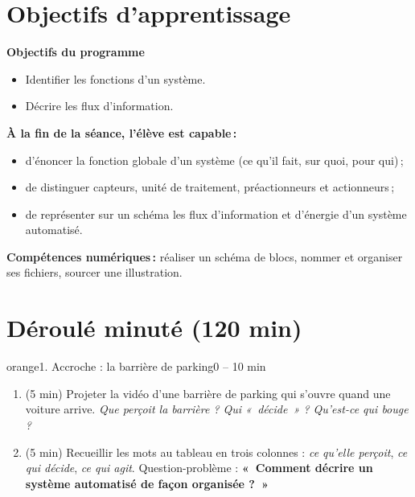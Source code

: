 \documentclass[11pt,a4paper]{article}
\begin{document}
\section{Objectifs d'apprentissage}
\begin{tcolorbox}[colback=gray!8,colframe=gray!60!black,arc=1mm,boxrule=0.5pt]
\textbf{Objectifs du programme}
\begin{itemize}
 \item Identifier les fonctions d'un système.
 \item Décrire les flux d'information.
\end{itemize}
\textbf{À la fin de la séance, l'élève est capable\,:}
\begin{itemize}
 \item d'énoncer la fonction globale d'un système (ce qu'il fait, sur quoi, pour qui)\,;
 \item de distinguer capteurs, unité de traitement, préactionneurs et actionneurs\,;
 \item de représenter sur un schéma les flux d'information et d'énergie d'un système automatisé.
\end{itemize}
\textbf{Compétences numériques\,:} réaliser un schéma de blocs, nommer et organiser ses fichiers, sourcer une illustration.
\end{tcolorbox}

\section{Déroulé minuté (120 min)}

\begin{etape}{orange}{1. Accroche : la barrière de parking}{0 -- 10 min}
\begin{enumerate}
 \item (5 min) Projeter la vidéo d'une barrière de parking qui s'ouvre quand une voiture arrive. \emph{Que perçoit la barrière ? Qui «~décide~» ? Qu'est-ce qui bouge ?}
 \item (5 min) Recueillir les mots au tableau en trois colonnes : \emph{ce qu'elle perçoit}, \emph{ce qui décide}, \emph{ce qui agit}. Question-problème : \textbf{«~Comment décrire un système automatisé de façon organisée ?~»}
\end{enumerate}
\end{etape}
\end{document}
